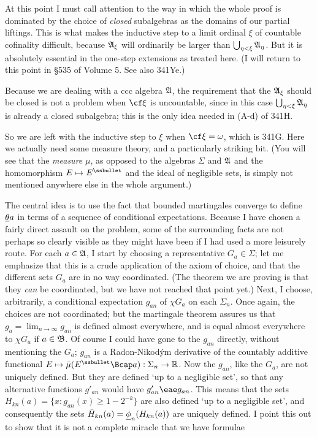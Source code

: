 { At this point I must call attention to the way
in which the whole proof is dominated by the choice of {\it closed}
subalgebras as the domains of our partial liftings.   This is what makes
the inductive step to a limit ordinal $\xi$ of countable cofinality
difficult, because $\frak A_{\xi}$ will ordinarily be larger than
$\bigcup_{\eta<\xi}\frak A_{\eta}$.   But it is absolutely essential in
the one-step extensions as treated here.   (I will return to this point in
\S535 of Volume 5.   See also 341Ye.)

Because we are dealing with a ccc algebra $\frak A$, the requirement
that the $\frak A_{\xi}$ should be closed is not a problem when
$\cf\xi$ is uncountable, since in this case
$\bigcup_{\eta<\xi}\frak A_{\eta}$ is already a closed subalgebra;
this is the only idea needed in (A-d) of 341H.

 So we are left with the inductive step to $\xi$
when $\cf\xi=\omega$, which is 341G.   Here we actually need some
measure theory, and a particularly striking bit.   (You will see that
the {\it measure} $\mu$, as opposed to the algebras $\Sigma$ and
$\frak A$ and the homomorphism $E\mapsto E^{\ssbullet}$ and the ideal of
negligible sets, is simply not mentioned anywhere else in the whole
argument.)

\medskip

The central idea is to use the fact that bounded martingales converge to
define $\underline{\theta} a$ in terms of a sequence of conditional
expectations.   Because I have chosen a fairly direct assault on the
problem, some of the surrounding facts are not perhaps so clearly
visible as they might have been if I had used a more leisurely route.
For each $a\in\frak A$, I start by choosing a representative
$G_a\in\Sigma$;  let me emphasize that this is a crude application of
the axiom of choice, and that the different sets $G_a$ are in no way
coordinated.   (The theorem we are proving is that
they {\it can} be coordinated, but we have not reached that point yet.)
Next, I choose, arbitrarily, a conditional expectation $g_{an}$ of
$\chi G_a$ on each
$\Sigma_n$.   Once again, the choices are not coordinated;
but the martingale theorem assures us that $g_a=\lim_{n\to\infty}g_{an}$
is defined almost everywhere, and is equal almost everywhere to
$\chi G_a$ if $a\in\frak B$.   Of course I could have gone to the $g_{an}$
directly, without mentioning the $G_a$;  $g_{an}$ is a Radon-Nikod\'ym
derivative of the countably additive functional
$E\mapsto\bar\mu(E^{\ssbullet}\Bcap a):\Sigma_n\to\Bbb R$.   Now the
$g_{an}$, like the $G_a$, are not uniquely defined.   But they are
defined `up to a negligible set', so that any alternative functions
$g'_{an}$ would have $g'_{an}\eae g_{an}$.   This means that the sets
$H_{kn}(a)=\{x:g_{an}(x)\ge 1-2^{-k}\}$ are also defined `up to a
negligible set', and consequently the sets
$\tilde H_{kn}(a)={\underline{\phi}}_{n}(H_{kn}(a))$ are uniquely defined.   I point
this out to show that it is not a complete miracle that we have formulae

}
